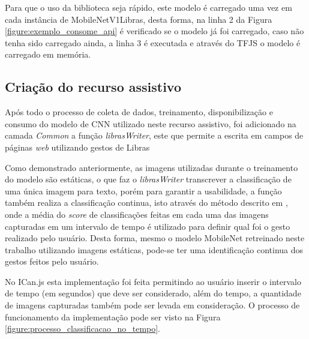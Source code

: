 \par Para que o uso da biblioteca seja rápido, este modelo é carregado uma vez em cada instância de MobileNetV1Libras, desta forma, na linha 2 da Figura \ref{figure:exemplo_consome_api} é verificado se o modelo já foi carregado, caso não tenha sido carregado ainda, a linha 3 é executada e através do TFJS o modelo é carregado em memória.

\subsection{Criação do recurso assistivo}

\par Após todo o processo de coleta de dados, treinamento, disponibilização e consumo do modelo de CNN utilizado neste recurso assistivo, foi adicionado na camada \textit{Common} a função \textit{librasWriter}, este que permite a escrita em campos de páginas \textit{web} utilizando gestos de Libras

\par Como demonstrado anteriormente, as imagens utilizadas durante o treinamento do modelo são estáticas, o que faz o \textit{librasWriter} transcrever a classificação de uma única imagem para texto, porém para garantir a usabilidade, a função também realiza a classificação continua, isto através do método descrito em \cite{Magalh2018}, onde a média do \textit{score} de classificações feitas em cada uma das imagens capturadas em um intervalo de tempo é utilizado para definir qual foi o gesto realizado pelo usuário. Desta forma, mesmo o modelo MobileNet retreinado neste trabalho utilizando imagens estáticas, pode-se ter uma identificação continua dos gestos feitos pelo usuário. 

\par No ICan.js esta implementação foi feita permitindo ao usuário inserir o intervalo de tempo (em segundos) que deve ser considerado, além do tempo, a quantidade de imagens capturadas também pode ser levada em consideração. O processo de funcionamento da implementação pode ser visto na Figura \ref{figure:processo_classificacao_no_tempo}.



